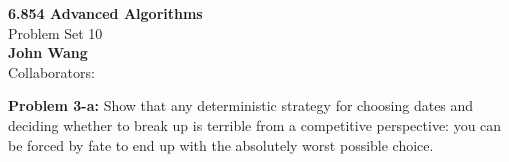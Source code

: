 \documentclass[psamsfonts]{amsart}
\newenvironment{sol}{\vspace{0.25cm}{\large \bfseries Solution:}}{\qedsymbol}
\newenvironment{prob}[1]{\begin{framed}{\large \bfseries Problem #1:}}{\end{framed}}
\newcommand{\makenewtitle}{
    \begin{center}
    {\huge \bfseries 6.854 Advanced Algorithms} \\
    Problem Set 10\\
    \vspace{0.25cm}
    {\bfseries John Wang} \\
    Collaborators:  
    \end{center}
    \vspace{0.5cm}
}
\begin{document}
\newpage
\makenewtitle

\begin{prob}{3-a}
Show that any deterministic strategy for choosing dates and deciding whether to break up is terrible from a competitive perspective: you can be forced by fate to end up with the absolutely worst possible choice.
\end{prob}
\begin{sol}

\end{sol}
\end{document}
